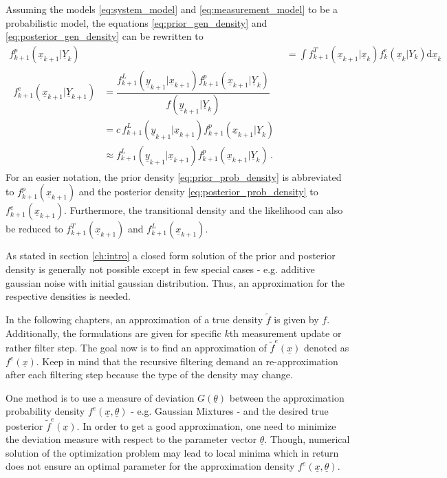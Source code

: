 \documentclass[a4paper]{IEEEtran}
\begin{document}
Assuming the models \eqref{eq:system_model} and \eqref{eq:measurement_model} to be a probabilistic model, the equations \eqref{eq:prior_gen_density} and \eqref{eq:posterior_gen_density}
can be rewritten to
\begin{align}
    f^{p}_{k+1}(\underline{x}_{k+1} \vert  \underline{Y}_{k}) &= \int f^{T}_{k+1}(\underline{x}_{k+1} \vert \underline{x}_{k})f^{e}_{k}(\underline{x}_{k} \vert Y_{k})\mathrm{d}\underline{x}_{k} \label{eq:prior_prob_density} \\
    \begin{split}
        f^e_{k+1}(\underline{x}_{k+1} \vert \underline{Y}_{k+1})  &=  \dfrac{f^{L}_{k+1}(\underline{y}_{k+1} \vert \underline{x}_{k+1}) f^{p}_{k+1}(\underline{x}_{k+1} \vert \underline{Y}_{k})}{f(\underline{y}_{k+1} \vert \underline{Y}_{k})} \\
        &= c \, f^{L}_{k+1}(\underline{y}_{k+1} \vert \underline{x}_{k+1}) f^{p}_{k+1}(\underline{x}_{k+1} \vert \underline{Y}_{k}) \\
        &\approx f^{L}_{k+1}(\underline{y}_{k+1} \vert \underline{x}_{k+1}) f^{p}_{k+1}(\underline{x}_{k+1} \vert \underline{Y}_{k})    \,. \label{eq:posterior_prob_density}
    \end{split}
\end{align}    
For an easier notation, the prior density \eqref{eq:prior_prob_density} is abbreviated to $f^{p}_{k+1}(\underline{x}_{k+1})$ and the posterior density \eqref{eq:posterior_prob_density} to $f^e_{k+1}(\underline{x}_{k+1})$. 
Furthermore, the transitional density and the likelihood can also be reduced to $f^{T}_{k+1}(\underline{x}_{k+1})$ and $f^{L}_{k+1}(\underline{x}_{k+1})$.

As stated in section \ref{ch:intro} a closed form solution of the prior and posterior density is generally not possible except in few special cases - e.g. additive gaussian noise with initial gaussian distribution. Thus, an approximation for the 
respective densities is needed. 

In the following chapters, an approximation of a true density $\tilde{f}$ is given by $f$. Additionally, the formulations are given for specific $k$th measurement update or rather filter step. The goal now is to find an approximation of $\tilde{f}^e(\underline{x})$ 
denoted as $f^e(\underline{x})$. Keep in mind that the recursive filtering demand an re-approximation after each filtering step because the type of the density may change. 

One method is to use a measure of deviation $G(\underline{\theta})$ between the approximation probability density 
$f^e(\underline{x}, \underline{\theta})$ - e.g. Gaussian Mixtures - and the desired true posterior $\tilde{f}^{e}(\underline{x})$. In order to get a good approximation, one need to minimize the deviation measure with respect to the 
parameter vector $\underline{\theta}$. Though, numerical solution of the optimization problem may lead to local minima which in return does not ensure an optimal parameter for the 
approximation density $f^e(\underline{x}, \underline{\theta})$. 
\end{document}
